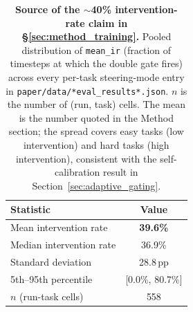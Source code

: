 \begin{table}[t]
\centering
\caption{\textbf{Source of the $\sim$40\% intervention-rate claim in \S\ref{sec:method_training}.} Pooled distribution of \texttt{mean\_ir} (fraction of timesteps at which the double gate fires) across every per-task steering-mode entry in \texttt{paper/data/*eval\_results*.json}. $n$ is the number of (run, task) cells. The mean is the number quoted in the Method section; the spread covers easy tasks (low intervention) and hard tasks (high intervention), consistent with the self-calibration result in Section~\ref{sec:adaptive_gating}.}
\label{tab:intervention_rate}
\begin{tabular}{lc}
\toprule
Statistic & Value \\
\midrule
Mean intervention rate & \textbf{39.6\%} \\
Median intervention rate & 36.9\% \\
Standard deviation & 28.8\,pp \\
5th--95th percentile & [0.0\%, 80.7\%] \\
$n$ (run-task cells) & 558 \\
\bottomrule
\end{tabular}
\end{table}
